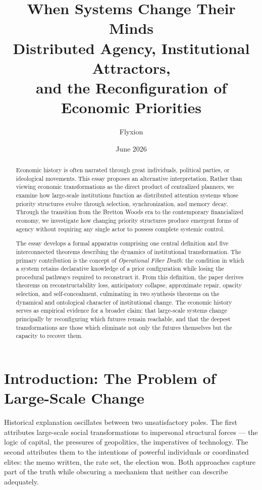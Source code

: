 \documentclass[12pt, a4paper]{article}
\title{%
  \textbf{When Systems Change Their Minds}\\[0.4em]
  \large Distributed Agency, Institutional Attractors,\\
  and the Reconfiguration of Economic Priorities
}
\author{Flyxion}
\date{June 2026}
\theoremstyle{named}
\begin{document}
\maketitle
\thispagestyle{empty}

\begin{abstract}
Economic history is often narrated through great individuals, political
parties, or ideological movements. This essay proposes an alternative
interpretation. Rather than viewing economic transformations as the
direct product of centralized planners, we examine how large-scale
institutions function as distributed attention systems whose priority
structures evolve through selection, synchronization, and memory decay.
Through the transition from the Bretton Woods era to the contemporary
financialized economy, we investigate how changing priority structures
produce emergent forms of agency without requiring any single actor to
possess complete systemic control.

The essay develops a formal apparatus comprising one central definition
and five interconnected theorems describing the dynamics of institutional
transformation. The primary contribution
is the concept of \emph{Operational Fiber Death}: the condition in which
a system retains declarative knowledge of a prior configuration while
losing the procedural pathways required to reconstruct it. From this
definition, the paper derives theorems on reconstructability loss,
anticipatory collapse, approximate repair, opacity selection, and
self-concealment, culminating in two synthesis theorems on the dynamical
and ontological character of institutional change. The economic history
serves as empirical evidence for a broader claim: that large-scale
systems change principally by reconfiguring which futures remain
reachable, and that the deepest transformations are those which
eliminate not only the futures themselves but the capacity to recover
them.
\end{abstract}

\newpage
\tableofcontents
\newpage

\section{Introduction: The Problem of Large-Scale Change}

Historical explanation oscillates between two unsatisfactory poles. The
first attributes large-scale social transformations to impersonal
structural forces — the logic of capital, the pressures of geopolitics,
the imperatives of technology. The second attributes them to the
intentions of powerful individuals or coordinated elites: the memo
written, the rate set, the election won. Both approaches capture part of
the truth while obscuring a mechanism that neither can describe
adequately.
\end{document}
